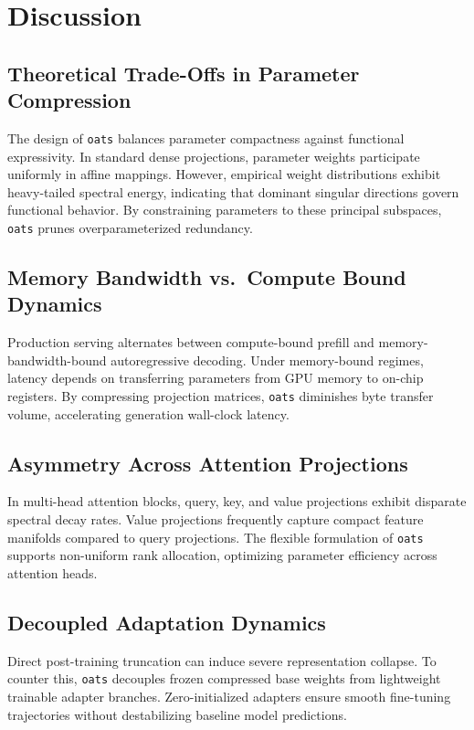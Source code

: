 \section{Discussion}

\subsection{Theoretical Trade-Offs in Parameter Compression}
The design of \texttt{oats} balances parameter compactness against functional expressivity. In standard dense projections, parameter weights participate uniformly in affine mappings. However, empirical weight distributions exhibit heavy-tailed spectral energy, indicating that dominant singular directions govern functional behavior. By constraining parameters to these principal subspaces, \texttt{oats} prunes overparameterized redundancy.

\subsection{Memory Bandwidth vs.\ Compute Bound Dynamics}
Production serving alternates between compute-bound prefill and memory-bandwidth-bound autoregressive decoding. Under memory-bound regimes, latency depends on transferring parameters from GPU memory to on-chip registers. By compressing projection matrices, \texttt{oats} diminishes byte transfer volume, accelerating generation wall-clock latency.

\subsection{Asymmetry Across Attention Projections}
In multi-head attention blocks, query, key, and value projections exhibit disparate spectral decay rates. Value projections frequently capture compact feature manifolds compared to query projections. The flexible formulation of \texttt{oats} supports non-uniform rank allocation, optimizing parameter efficiency across attention heads.

\subsection{Decoupled Adaptation Dynamics}
Direct post-training truncation can induce severe representation collapse. To counter this, \texttt{oats} decouples frozen compressed base weights from lightweight trainable adapter branches. Zero-initialized adapters ensure smooth fine-tuning trajectories without destabilizing baseline model predictions.

